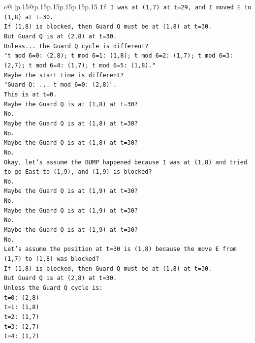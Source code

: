 \documentclass{article}
\begin{document}
{\begin{supertabular}{c@{$\;$}|p{.15\linewidth}@{}p{.15\linewidth}p{.15\linewidth}p{.15\linewidth}p{.15\linewidth}p{.15\linewidth}}
{{{\texttt{If I was at (1,7) at t=29, and I moved E to (1,8) at t=30.} \\
\texttt{If (1,8) is blocked, then Guard Q must be at (1,8) at t=30.} \\
\texttt{But Guard Q is at (2,8) at t=30.} \\
\texttt{Unless... the Guard Q cycle is different?} \\
\texttt{"t mod 6=0: (2,8); t mod 6=1: (1,8); t mod 6=2: (1,7); t mod 6=3: (2,7); t mod 6=4: (1,7); t mod 6=5: (1,8)."} \\
\texttt{Maybe the start time is different?} \\
\texttt{"Guard Q: ... t mod 6=0: (2,8)".} \\
\texttt{This is at t=0.} \\
\texttt{Maybe the Guard Q is at (1,8) at t=30?} \\
\texttt{No.} \\
\texttt{Maybe the Guard Q is at (1,8) at t=30?} \\
\texttt{No.} \\
\texttt{Maybe the Guard Q is at (1,8) at t=30?} \\
\texttt{No.} \\
\texttt{Okay, let's assume the BUMP happened because I was at (1,8) and tried to go East to (1,9), and (1,9) is blocked?} \\
\texttt{No.} \\
\texttt{Maybe the Guard Q is at (1,9) at t=30?} \\
\texttt{No.} \\
\texttt{Maybe the Guard Q is at (1,9) at t=30?} \\
\texttt{No.} \\
\texttt{Maybe the Guard Q is at (1,9) at t=30?} \\
\texttt{No.} \\
\texttt{Let's assume the position at t=30 is (1,8) because the move E from (1,7) to (1,8) was blocked?} \\
\texttt{If (1,8) is blocked, then Guard Q must be at (1,8) at t=30.} \\
\texttt{But Guard Q is at (2,8) at t=30.} \\
\texttt{Unless the Guard Q cycle is:} \\
\texttt{t=0: (2,8)} \\
\texttt{t=1: (1,8)} \\
\texttt{t=2: (1,7)} \\
\texttt{t=3: (2,7)} \\
\texttt{t=4: (1,7)} \\
}}}
\end{supertabular}}
\end{document}
